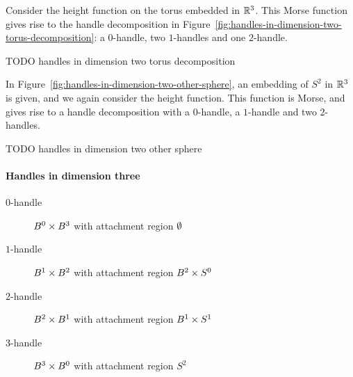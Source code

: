 \begin{eg}
    Consider the height function on the torus embedded in $\mathbb{R}^3$. This Morse function gives rise to the handle decomposition in Figure~\ref{fig:handles-in-dimension-two-torus-decomposition}: a $0$-handle, two $1$-handles and one $2$-handle.
\end{eg}

\begin{marginfigure}
    \centering
    \caption{TODO handles in dimension two torus decomposition}
    \label{fig:handles-in-dimension-two-torus-decomposition}
\end{marginfigure}

\begin{eg}
    In Figure~\ref{fig:handles-in-dimension-two-other-sphere}, an embedding of $S^2$ in $\mathbb{R}^3$ is given, and we again consider the height function.
    This function is Morse, and gives rise to a handle decomposition with a $0$-handle, a $1$-handle and two $2$-handles.
\end{eg}
\begin{marginfigure}
    \centering
    \caption{TODO handles in dimension two other sphere}
    \label{fig:handles-in-dimension-two-other-sphere}
\end{marginfigure}



\paragraph{Handles in dimension three}


\begin{description}
    \item[$0$-handle] $ B^{0} \times B^{3}$ with attachment region $\emptyset$ 
        \hfill{}
    \item[$1$-handle] $ B^{1} \times B^{2}$ with attachment region $ B^{2} \times S^{0}$
        \hfill{}
    \item[$2$-handle] $ B^{2} \times B^{1}$ with attachment region $ B^{1} \times S^1$
        \hfill{}
    \item[$3$-handle] $ B^{3} \times B^{0}$ with attachment region $S^{2}$
        \hfill{}
\end{description}


